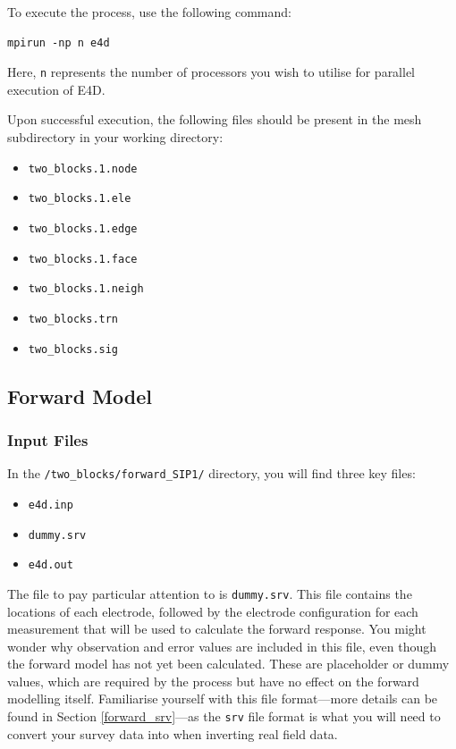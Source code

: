 \documentclass[a4paper,12pt]{article}
\begin{document}
To execute the process, use the following command:

\begin{verbatim}
mpirun -np n e4d
\end{verbatim}

Here, \texttt{n} represents the number of processors you wish to utilise for
parallel execution of E4D.

Upon successful execution, the following files should be present in the mesh subdirectory in your
working directory:

\begin{itemize}
    \item \texttt{two\_blocks.1.node}
    \item \texttt{two\_blocks.1.ele}
    \item \texttt{two\_blocks.1.edge}
    \item \texttt{two\_blocks.1.face}
    \item \texttt{two\_blocks.1.neigh}
    \item \texttt{two\_blocks.trn}
    \item \texttt{two\_blocks.sig}
\end{itemize}

\subsection{Forward Model} \label{two_blocks_forward}

\subsubsection{Input Files}

In the \texttt{/two\_blocks/forward\_SIP1/} directory, you will find three key
files:

\begin{itemize}
    \item \texttt{e4d.inp}
    \item \texttt{dummy.srv}
    \item \texttt{e4d.out}
\end{itemize}

The file to pay particular attention to is \texttt{dummy.srv}. This file
contains the locations of each electrode, followed by the electrode
configuration for each measurement that will be used to calculate the forward
response. You might wonder why observation and error values are included in
this file, even though the forward model has not yet been calculated. These are
placeholder or dummy values, which are required by the process but have no
effect on the forward modelling itself. Familiarise yourself with this file
format—more details can be found in Section \ref{forward_srv}—as the
\texttt{srv} file format is what you will need to convert your survey data into
when inverting real field data.
\end{document}
